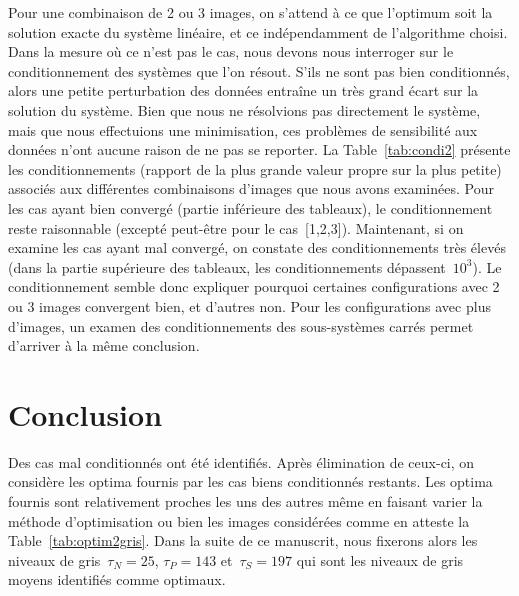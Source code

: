 \documentclass[main.tex]{subfiles}
\begin{document}
Pour une combinaison de 2 ou 3 images, on s'attend à ce que l'optimum soit la solution exacte du système linéaire, et ce indépendamment de l'algorithme choisi. Dans la mesure où ce n'est pas le cas, nous devons nous interroger sur le conditionnement des systèmes que l'on résout. S'ils ne 
sont pas bien conditionnés, alors une petite perturbation des données entraîne un très grand écart sur la solution du système. Bien que nous ne résolvions pas directement le système, mais que nous effectuions une minimisation, ces problèmes de sensibilité aux données n'ont aucune raison de ne pas se reporter. La Table~\ref{tab:condi2} présente les conditionnements (rapport de la plus grande valeur propre sur la plus petite) associés aux différentes combinaisons d'images que nous avons examinées. 
Pour les cas ayant bien convergé (partie inférieure des tableaux), le conditionnement reste raisonnable (excepté peut-être pour le cas~[1,2,3]). 
Maintenant, si on examine les cas ayant mal convergé, on constate des conditionnements très élevés (dans la partie supérieure des tableaux, les conditionnements dépassent~$10^3$). 
Le conditionnement semble donc expliquer pourquoi certaines configurations avec 2 ou 3 images convergent bien, et d'autres non. 
Pour les configurations avec plus d'images, un examen des conditionnements des sous-systèmes carrés permet d'arriver à la même conclusion. 


\section{Conclusion}
Des cas mal conditionnés ont été identifiés. Après élimination de ceux-ci, on considère les optima fournis par les cas biens conditionnés restants. Les optima fournis sont relativement proches les uns des autres même en faisant varier la méthode d'optimisation ou bien les images considérées comme en atteste la Table~\ref{tab:optim2gris}. Dans la suite de ce manuscrit, nous fixerons alors les niveaux de gris~$\tau_N=25$, $\tau_P=143$ et~$\tau_S=197$ qui sont les niveaux de gris moyens identifiés comme optimaux. 
\end{document}
